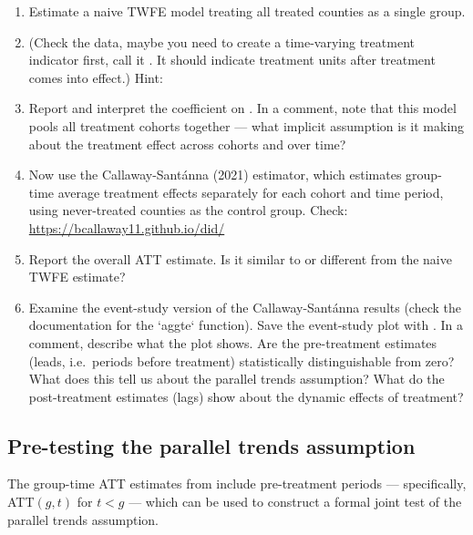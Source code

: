 \begin{enumerate}[label=\alph*)]
  \item Estimate a naive TWFE model treating all treated counties as a single group.
  \item[] (Check the data, maybe you need to create a time-varying treatment indicator first, call it . It should indicate treatment units after treatment comes into effect.) Hint: 
  \item[] Report and interpret the coefficient on . In a comment, note that this model pools all treatment cohorts together --- what implicit assumption is it making about the treatment effect across cohorts and over time?
  \item Now use the Callaway-Sant\'{a}nna (2021) estimator, which estimates group-time average treatment effects separately for each cohort and time period, using never-treated counties as the control group. Check: \url{https://bcallaway11.github.io/did/}
  \item[] Report the overall ATT estimate. Is it similar to or different from the naive TWFE estimate?
  \item Examine the event-study version of the Callaway-Sant\'{a}nna results (check the documentation for the `aggte` function).
  Save the event-study plot with . In a comment, describe what the plot shows. Are the pre-treatment estimates (leads, i.e.\ periods before treatment) statistically distinguishable from zero? What does this tell us about the parallel trends assumption? What do the post-treatment estimates (lags) show about the dynamic effects of treatment?
\end{enumerate}

\subsection{Pre-testing the parallel trends assumption}

The group-time ATT estimates from  include pre-treatment periods --- specifically, ATT$(g,t)$ for $t < g$ --- which can be used to construct a formal joint test of the parallel trends assumption.

